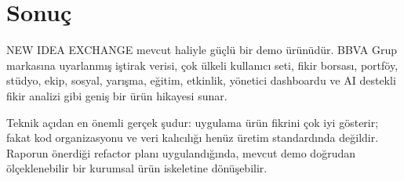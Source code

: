 \documentclass[11pt,a4paper]{article}
\begin{document}
\section{Sonuç}

NEW IDEA EXCHANGE mevcut haliyle güçlü bir demo ürünüdür. BBVA Grup markasına uyarlanmış iştirak verisi, çok ülkeli kullanıcı seti, fikir borsası, portföy, stüdyo, ekip, sosyal, yarışma, eğitim, etkinlik, yönetici dashboardu ve AI destekli fikir analizi gibi geniş bir ürün hikayesi sunar.

Teknik açıdan en önemli gerçek şudur: uygulama ürün fikrini çok iyi gösterir; fakat kod organizasyonu ve veri kalıcılığı henüz üretim standardında değildir. Raporun önerdiği refactor planı uygulandığında, mevcut demo doğrudan ölçeklenebilir bir kurumsal ürün iskeletine dönüşebilir.
\end{document}
